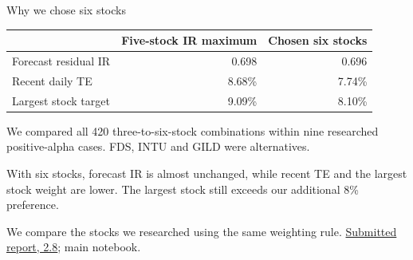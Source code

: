 \documentclass[aspectratio=169,11pt,t]{beamer}
\newcommand{\source}[1]{\par\vfill{\fontsize{6.3}{8}\selectfont\color{muted}#1\par}}
\newcommand{\reportsection}[1]{\href{https://kybeka.github.io/meridian-capital/materials/round-2-report.pdf}{Submitted report, #1}}
\begin{document}
\begin{frame}{Why we chose six stocks}

\begin{center}\begin{tabular}{@{}lrr@{}}\toprule
 & Five-stock IR maximum & Chosen six stocks\\\midrule
Forecast residual IR & 0.698 & 0.696\\
Recent daily TE & 8.68\% & 7.74\%\\
Largest stock target & 9.09\% & 8.10\%\\\bottomrule
\end{tabular}\end{center}\vspace{.25cm}
\small We compared all 420 three-to-six-stock combinations within nine researched positive-alpha cases. FDS, INTU and GILD were alternatives.
\par\vspace{.25cm}With six stocks, forecast IR is almost unchanged, while recent TE and the largest stock weight are lower. The largest stock still exceeds our additional 8\% preference.
\source{We compare the stocks we researched using the same weighting rule. \reportsection{2.8}; main notebook.}

\end{frame}
\end{document}
